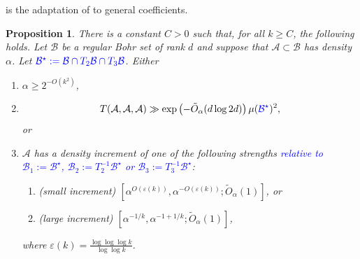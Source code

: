 \documentclass{daj}
\newtheorem{proposition}[theorem]{Proposition}
\theoremstyle{definition}
\newcommand{\eps}{\varepsilon}
\newcommand{\A}{\ensuremath{\mathcal{A}}}
\newcommand{\B}{\ensuremath{\mathcal{B}}}
\newcommand{\blue}[1]{\textcolor{blue}{#1}}
\begin{document}
 is the adaptation of \cite[Proposition~5.5]{BS} to general coefficients.

\begin{proposition}
\label{prop:incrementOrSolutions}
There is a constant $C>0$ such that, for all $k\geq C$, the following holds. Let $\B$ be a regular Bohr set of rank $d$ and suppose that $\A\subset \B$ has density $\alpha$. Let $\blue{\B^{\star} := \B \cap T_2\B \cap T_3\B}$. Either 
\begin{enumerate}
	\item $\alpha \geq 2^{-O(k^2)}$, 
	\item \begin{equation*}
	T(\A, \A, \A) \gg \exp\left(-\tilde{O}_{\alpha}(d \log{2d})\right) \mu(\blue{\B^{\star}})^2,
	\end{equation*}
	or
	\item $\A$ has a density increment of one of the following strengths \blue{relative to $\B_1:=\B^{\star}$, $\B_2:=T_2^{-1}\B^{\star}$ or $\B_3:=T_3^{-1}\B^{\star}$}: 
	\begin{enumerate}
		\item (small increment) $[\alpha^{O(\eps(k))}, \alpha^{-O(\eps(k))}; \tilde{O}_{\alpha}(1)]$, or
		\item (large increment) $[\alpha^{-1/k}, \alpha^{-1+1/k}; \tilde{O}_{\alpha}(1)]$,
	\end{enumerate}
	where $\eps(k) = \frac{ \log \log \log k}{\log \log k}$.
\end{enumerate}
\end{proposition}
\end{document}
